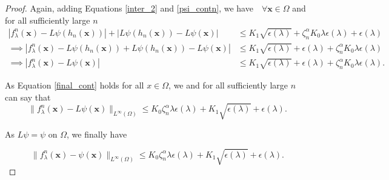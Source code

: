 \documentclass[multixcb]{amstext-l}
\theoremstyle{plain}
\theoremstyle{definition}
\theoremstyle{definition}
\theoremstyle{remark}
\numberwithin{equation}{chapter}
\begin{document}
\begin{proof}
Again, adding Equations \ref{inter_2} and \ref{psi_contn}, we have $ \mbox{   }\forall \boldsymbol{x}\in\Omega$  and for all sufficiently large $n$
\begin{equation}\label{final_cont}
\begin{aligned}
    \left| f^n_{\lambda}(\boldsymbol{x}) -L\psi(h_n(\boldsymbol{x})) \right| + \left|L\psi(h_n(\boldsymbol{x})) - L\psi(\boldsymbol{x})\right| &\le  K_1\sqrt{\epsilon(\lambda)} + \zeta_n^{\alpha}K_0\lambda\epsilon(\lambda) + \epsilon(\lambda) \\
    \implies \left| f^n_{\lambda}(\boldsymbol{x}) -L\psi(h_n(\boldsymbol{x})) + L\psi(h_n(\boldsymbol{x})) - L\psi(\boldsymbol{x})\right| &\le  K_1\sqrt{\epsilon(\lambda)} +  \epsilon(\lambda) + \zeta_n^{\alpha}K_0\lambda\epsilon(\lambda)\\
    \implies \left| f^n_{\lambda}(\boldsymbol{x}) - L\psi(\boldsymbol{x})\right| &\le  K_1\sqrt{\epsilon(\lambda)} +  \epsilon(\lambda) + \zeta_n^{\alpha}K_0\lambda\epsilon(\lambda) .
\end{aligned}
\end{equation}

As Equation \ref{final_cont} holds for all $x\in\Omega$, we and for all sufficiently large $n$ can say that 
\begin{equation}\label{conclude_pre}
\| f^n_{\lambda}(\boldsymbol{x}) - L\psi(\boldsymbol{x})\|_{L^{\infty}(\Omega)} \le   K_0\zeta_n^{\alpha}\lambda\epsilon(\lambda) + K_1\sqrt{\epsilon(\lambda)} + \epsilon(\lambda).
\end{equation}

As $L\psi = \psi$ on $\Omega$, we finally have 

\begin{equation}\label{conclude}
\| f^n_{\lambda}(\boldsymbol{x}) - \psi(\boldsymbol{x})\|_{L^{\infty}(\Omega)} \le   K_0\zeta_n^{\alpha}\lambda\epsilon(\lambda) + K_1\sqrt{\epsilon(\lambda)} + \epsilon(\lambda).
\end{equation}



\end{proof}
\end{document}
